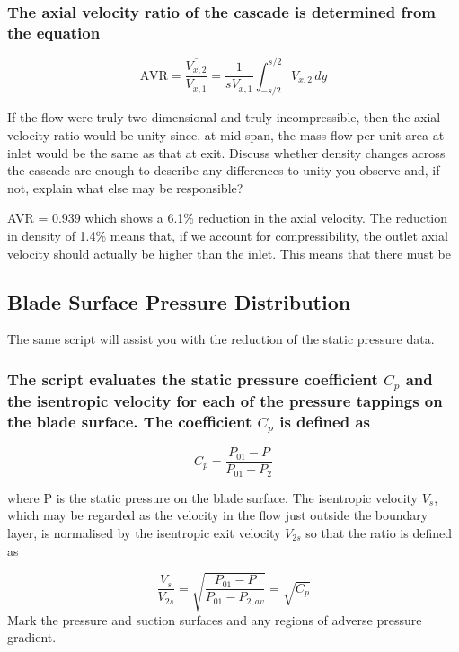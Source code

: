 \documentclass{article}
\begin{document}
\subsubsection{The axial velocity ratio of the cascade is determined from the equation
}
\begin{equation}
    \text{AVR} = \frac{\overline{V_{x,2}}}{V_{x,1}} = \frac{1}{s V_{x,1}} \int_{-s/2}^{s/2} V_{x,2} \, dy
\end{equation}

If the flow were truly two dimensional and truly incompressible, then the axial velocity ratio
would be unity since, at mid-span, the mass flow per unit area at inlet would be the same as
that at exit. Discuss whether density changes across the cascade are enough to describe any
differences to unity you observe and, if not, explain what else may be responsible?

AVR = $0.939$ which shows a 6.1\% reduction in the axial velocity.
The reduction in density of 1.4\% means that, if we account for compressibility, the outlet axial velocity should actually be higher than the inlet.
This means that there must be 


\subsection{Blade Surface Pressure Distribution}

The same script will assist you with the reduction of the static pressure data.
\subsubsection{The script evaluates the static pressure coefficient $C_p$ and the isentropic velocity for
each of the pressure tappings on the blade surface. The coefficient $C_p$ is defined as}

\begin{equation}
    C_p = \frac{P_{01} - P}{P_{01} - P_2}
\end{equation}

where P is the static pressure on the blade surface. The isentropic velocity
$V_s$, which may be
regarded as the velocity in the flow just outside the boundary layer, is normalised by the
isentropic exit velocity
$V_{2s}$ so that the ratio is defined as

\begin{equation}
    \frac{V_s}{V_{2s}} = \sqrt{\frac{P_{01} - P}{P_{01} - P_{2,av}}} = \sqrt{C_p}
\end{equation}
Mark the pressure and suction surfaces and any regions of adverse pressure gradient.
\end{document}
